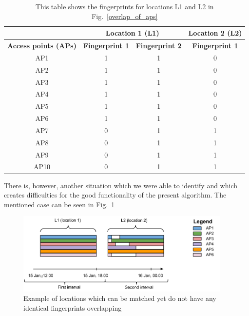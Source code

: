 \begin{table}[!h]
\begin{tabular}{|c|c|c|c|}
\hline
\multicolumn{1}{|l|}{}       & \multicolumn{2}{c|}{\textbf{Location 1 (L1)}}   & \textbf{Location 2 (L2)} \\ \hline
\textbf{Access points (APs)} & \textbf{Fingerprint 1} & \textbf{Fingerprint 2} & \textbf{Fingerprint 1}   \\ \hline
AP1                          & 1                      & 1                      & 0                        \\
AP2                          & 1                      & 1                      & 0                        \\
AP3                          & 1                      & 1                      & 0                        \\
AP4                          & 1                      & 1                      & 0                        \\
AP5                          & 1                      & 1                      & 0                        \\
AP6                          & 1                      & 1                      & 0                        \\
AP7                          & 0                      & 1                      & 1                        \\
AP8                          & 0                      & 1                      & 1                        \\
AP9                          & 0                      & 1                      & 1                        \\
AP10                         & 0                      & 1                      & 1                        \\ \hline
\end{tabular}
\caption{This table shows the fingerprints for locations L1 and L2 in
Fig.~\ref{overlap_of_aps}}
\label{tab:table_fingerprints}
\end{table}

There is, however, another situation which we were able to identify and which
creates difficulties for the good functionality of the present algorithm. The
mentioned case can be seen in Fig.~\ref{diff_fp_same_loc}

\begin{figure}[!h]
\centering
\includegraphics[width=0.95\textwidth]{figures/matching/different_fp_same_loc.png}
\caption{Example of locations which can be matched yet do not have any identical
fingerprints overlapping}
\label{diff_fp_same_loc}
\end{figure}

